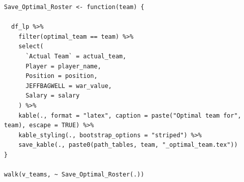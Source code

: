\documentclass{article}
\begin{document}
\begin{singlespace}
\begin{verbatim}
Save_Optimal_Roster <- function(team) {
  
  df_lp %>% 
    filter(optimal_team == team) %>% 
    select(
      `Actual Team` = actual_team,
      Player = player_name,
      Position = position, 
      JEFFBAGWELL = war_value,
      Salary = salary
    ) %>% 
    kable(., format = "latex", caption = paste("Optimal team for", team), escape = TRUE) %>% 
    kable_styling(., bootstrap_options = "striped") %>% 
    save_kable(., paste0(path_tables, team, "_optimal_team.tex"))  
}

walk(v_teams, ~ Save_Optimal_Roster(.))

\end{verbatim}


\end{singlespace}
\end{document}
